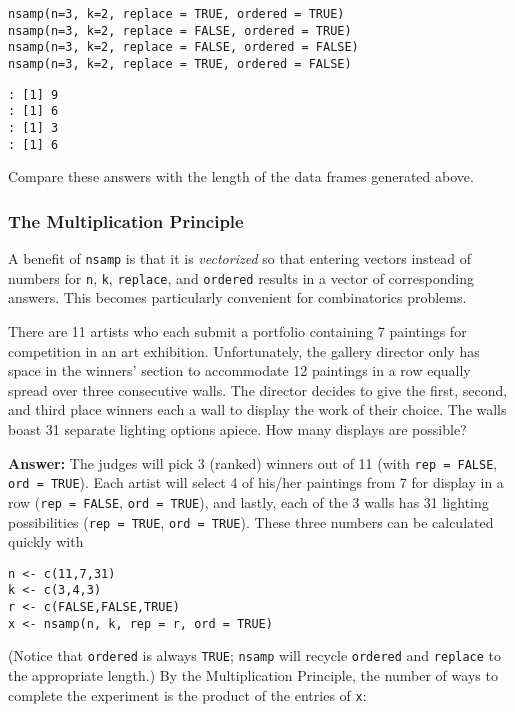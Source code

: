 \begin{Verbatim}
nsamp(n=3, k=2, replace = TRUE, ordered = TRUE) 
nsamp(n=3, k=2, replace = FALSE, ordered = TRUE) 
nsamp(n=3, k=2, replace = FALSE, ordered = FALSE) 
nsamp(n=3, k=2, replace = TRUE, ordered = FALSE) 
\end{Verbatim}

\begin{verbatim}
: [1] 9
: [1] 6
: [1] 3
: [1] 6
\end{verbatim}

Compare these answers with the length of the data frames generated above.

\subsubsection{The Multiplication Principle}
\label{sec-4-5-2-2}

A benefit of \texttt{nsamp} is that it is \emph{vectorized} so that entering
vectors instead of numbers for \texttt{n}, \texttt{k}, \texttt{replace}, and \texttt{ordered}
results in a vector of corresponding answers. This becomes
particularly convenient for combinatorics problems.


There are 11 artists who each submit a portfolio containing 7
paintings for competition in an art exhibition. Unfortunately, the
gallery director only has space in the winners' section to accommodate
12 paintings in a row equally spread over three consecutive walls. The
director decides to give the first, second, and third place winners
each a wall to display the work of their choice. The walls boast 31
separate lighting options apiece. How many displays are possible?

\textbf{Answer:} The judges will pick 3 (ranked) winners out of 11 (with \texttt{rep
= FALSE}, \texttt{ord = TRUE}). Each artist will select 4 of his/her
paintings from 7 for display in a row (\texttt{rep = FALSE}, \texttt{ord = TRUE}),
and lastly, each of the 3 walls has 31 lighting possibilities (\texttt{rep =
TRUE}, \texttt{ord = TRUE}). These three numbers can be calculated quickly
with

\begin{Verbatim}
n <- c(11,7,31) 
k <- c(3,4,3) 
r <- c(FALSE,FALSE,TRUE) 
x <- nsamp(n, k, rep = r, ord = TRUE) 
\end{Verbatim}

(Notice that \texttt{ordered} is always \texttt{TRUE}; \texttt{nsamp} will recycle
\texttt{ordered} and \texttt{replace} to the appropriate length.) By the
Multiplication Principle, the number of ways to complete the
experiment is the product of the entries of \texttt{x}:

